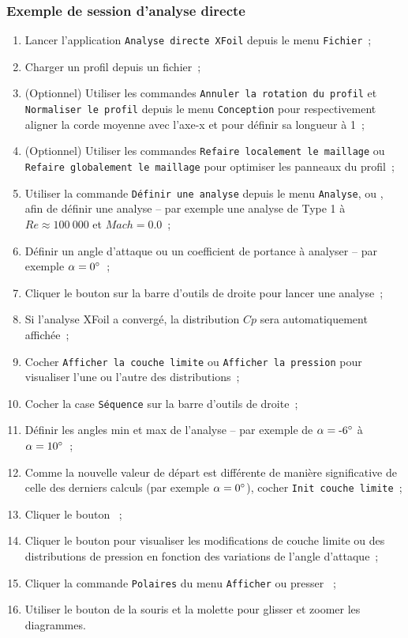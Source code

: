 \documentclass[a4paper,twoside,12pt,dvips]{article}
\begin{document}
\subsubsection{Exemple de session d’analyse directe}

\begin{enumerate}
	\item Lancer l’application \texttt{Analyse directe XFoil} depuis le menu
	\texttt{Fichier}~;
	\item Charger un profil depuis un fichier~;
	\item (Optionnel) Utiliser les commandes \texttt{Annuler la rotation du
	profil} et \texttt{Normaliser le profil} depuis le menu \texttt{Conception}
	pour respectivement aligner la corde moyenne avec l’axe-x et pour définir sa
	longueur à 1~;
	\item (Optionnel) Utiliser les commandes \texttt{Refaire localement le
	maillage} ou \texttt{Refaire globalement le maillage} pour optimiser les
	panneaux du profil~;
	\item Utiliser la commande \texttt{Définir une analyse} depuis le menu 
	\texttt{Analyse}, ou , afin de  définir une analyse – par
	exemple une analyse de Type 1 à $Re \approx 100~000$ et $Mach = 0.0$~;
	\item Définir un angle d’attaque ou un coefficient de portance à analyser
	– par exemple $ \alpha = 0\degree $~; 
	\item Cliquer le bouton  sur la barre d’outils de droite 
	pour lancer une analyse~;
	\item Si l’analyse XFoil a convergé, la distribution $Cp$ sera
	automatiquement affichée~;
	\item Cocher \texttt{Afficher la couche limite} ou \texttt{Afficher la
	pression} pour visualiser l’une ou l’autre des distributions~;
	\item Cocher la case \texttt{Séquence} sur la barre d’outils de droite~;
	\item Définir les angles min et max de l’analyse – par exemple de 
	$ \alpha = ‑6\degree $ à $ \alpha = 10\degree $~;
	\item Comme la nouvelle valeur de départ est différente de manière
	significative de celle des derniers calculs (par exemple 
	$ \alpha = 0\degree $), cocher \texttt{Init couche limite}~;
	\item Cliquer le bouton ~;
	\item Cliquer le bouton  pour visualiser les modifications de
	couche limite ou des distributions de pression en fonction des variations
	de l’angle d’attaque~;
	\item Cliquer la commande \texttt{Polaires} du menu \texttt{Afficher} ou 
	presser ~;
	\item Utiliser le bouton de la souris et la molette pour glisser et zoomer
	les diagrammes.
\end{enumerate}
\end{document}
